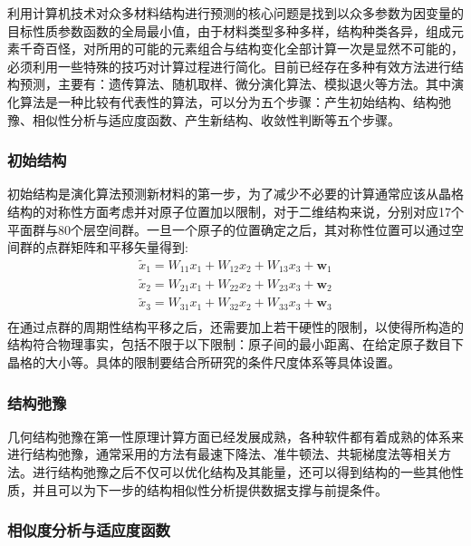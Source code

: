 利用计算机技术对众多材料结构进行预测的核心问题是找到以众多参数为因变量的目标性质参数函数的全局最小值，由于材料类型多种多样，结构种类各异，组成元素千奇百怪，对所用的可能的元素组合与结构变化全部计算一次是显然不可能的，必须利用一些特殊的技巧对计算过程进行简化。目前已经存在多种有效方法进行结构预测，主要有：遗传算法、随机取样、微分演化算法、模拟退火等方法。其中演化算法是一种比较有代表性的算法，可以分为五个步骤：产生初始结构、结构弛豫、相似性分析与适应度函数、产生新结构、收敛性判断等五个步骤。

\subsubsection{初始结构}

初始结构是演化算法预测新材料的第一步，为了减少不必要的计算通常应该从晶格结构的对称性方面考虑并对原子位置加以限制，对于二维结构来说，分别对应17个平面群与80个层空间群。一旦一个原子的位置确定之后，其对称性位置可以通过空间群的点群矩阵和平移矢量得到:
\begin{equation}
    \begin{split}
        \tilde{ x}_{1}= W_{11}x_{1}+W_{12}x_{2}+W_{13}x_{3}+\bm{w}_{1} \\
        \tilde{ x}_{2}= W_{21}x_{1}+W_{22}x_{2}+W_{23}x_{3}+\bm{w}_{2} \\
        \tilde{ x}_{3}= W_{31}x_{1}+W_{32}x_{2}+W_{33}x_{3}+\bm{w}_{3} \\
    \end{split}
    \label{eq:jg}
\end{equation}
在通过点群的周期性结构平移之后，还需要加上若干硬性的限制，以使得所构造的结构符合物理事实，包括不限于以下限制：原子间的最小距离、在给定原子数目下晶格的大小等。具体的限制要结合所研究的条件尺度体系等具体设置。

\subsubsection{结构弛豫}

几何结构弛豫在第一性原理计算方面已经发展成熟，各种软件都有着成熟的体系来进行结构弛豫，通常采用的方法有最速下降法、准牛顿法、共轭梯度法等相关方法。进行结构弛豫之后不仅可以优化结构及其能量，还可以得到结构的一些其他性质，并且可以为下一步的结构相似性分析提供数据支撑与前提条件。

\subsubsection{相似度分析与适应度函数}

